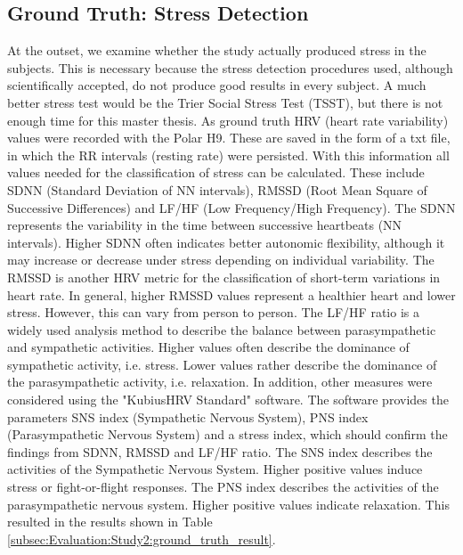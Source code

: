 \subsection{Ground Truth: Stress Detection}
\label{subsec:Evaluation:Study2:ground_truth}
At the outset, we examine whether the study actually produced stress in the subjects. 
This is necessary because the stress detection procedures used, although scientifically accepted, do not produce good results in every subject. 
A much better stress test would be the Trier Social Stress Test (TSST), but there is not enough time for this master thesis. 
As ground truth HRV (heart rate variability) values were recorded with the Polar H9.
These are saved in the form of a txt file, in which the RR intervals (resting rate) were persisted.
With this information all values needed for the classification of stress can be calculated.
These include SDNN (Standard Deviation of NN intervals), RMSSD (Root Mean Square of Successive Differences) and LF/HF (Low Frequency/High Frequency).
The SDNN represents the variability in the time between successive heartbeats (NN intervals). 
Higher SDNN often indicates better autonomic flexibility, although it may increase or decrease under stress depending on individual variability.
The RMSSD is another HRV metric for the classification of short-term variations in heart rate.
In general, higher RMSSD values represent a healthier heart and lower stress.
However, this can vary from person to person.
The LF/HF ratio is a widely used analysis method to describe the balance between parasympathetic and sympathetic activities. 
Higher values often describe the dominance of sympathetic activity, i.e. stress. 
Lower values rather describe the dominance of the parasympathetic activity, i.e. relaxation.
In addition, other measures were considered using the "KubiusHRV Standard" software.
The software provides the parameters SNS index (Sympathetic Nervous System), PNS index (Parasympathetic Nervous System) and a stress index, which should confirm the findings from SDNN, RMSSD and LF/HF ratio.
The SNS index describes the activities of the Sympathetic Nervous System. 
Higher positive values induce stress or fight-or-flight responses.
The PNS index describes the activities of the parasympathetic nervous system. 
Higher positive values indicate relaxation.
This resulted in the results shown in Table \ref{subsec:Evaluation:Study2:ground_truth_result}. 


